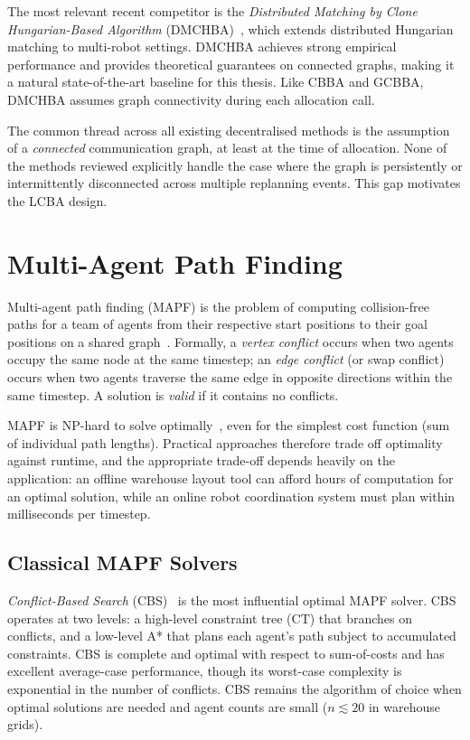 The most relevant recent competitor is the \emph{Distributed Matching by Clone
Hungarian-Based Algorithm} (DMCHBA)~\cite{samiei2024dmchba}, which extends
distributed Hungarian matching to multi-robot settings.
DMCHBA achieves strong empirical performance and provides theoretical
guarantees on connected graphs, making it a natural state-of-the-art
baseline for this thesis.
Like CBBA and GCBBA, DMCHBA assumes graph connectivity during each allocation
call.

The common thread across all existing decentralised methods is the assumption
of a \emph{connected} communication graph, at least at the time of allocation.
None of the methods reviewed explicitly handle the case where the graph is
persistently or intermittently disconnected across multiple replanning events.
This gap motivates the LCBA design.


\section{Multi-Agent Path Finding}
\label{sec:bg_mapf}

Multi-agent path finding (MAPF) is the problem of computing collision-free
paths for a team of agents from their respective start positions to their goal
positions on a shared graph~\cite{stern2019mapf}.
Formally, a \emph{vertex conflict} occurs when two agents occupy the same node
at the same timestep; an \emph{edge conflict} (or swap conflict) occurs when
two agents traverse the same edge in opposite directions within the same
timestep.
A solution is \emph{valid} if it contains no conflicts.

MAPF is NP-hard to solve optimally~\cite{stern2019mapf}, even for the simplest
cost function (sum of individual path lengths).
Practical approaches therefore trade off optimality against runtime, and the
appropriate trade-off depends heavily on the application: an offline warehouse
layout tool can afford hours of computation for an optimal solution, while an
online robot coordination system must plan within milliseconds per timestep.


\subsection{Classical MAPF Solvers}
\label{subsec:bg_mapf_classical}

\emph{Conflict-Based Search} (CBS)~\cite{sharon2015conflict} is the
most influential optimal MAPF solver.
CBS operates at two levels: a high-level constraint tree (CT) that branches
on conflicts, and a low-level A* that plans each agent's path subject to
accumulated constraints.
CBS is complete and optimal with respect to sum-of-costs and has excellent
average-case performance, though its worst-case complexity is exponential in
the number of conflicts.
CBS remains the algorithm of choice when optimal solutions are needed and
agent counts are small ($n \lesssim 20$ in warehouse grids).

